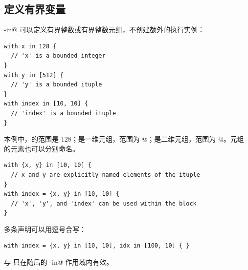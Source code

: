 \subsection*{定义有界变量}

\co@with-in@ 可以定义有界整数或有界整数元组，不创建额外的执行实例：

\begin{lstlisting}[language=croqtile,caption={一个有界变量}]
with x in 128 {
  // 'x' is a bounded integer
}
with y in [512] {
  // 'y' is a bounded ituple
}
with index in [10, 10] {
  // 'index' is a bounded ituple
}
\end{lstlisting}

本例中，\co@x@ 的范围是 128；\co@y@ 是一维元组，范围为 \co@[512]@；\co@index@ 是二维元组，范围为 \co@[10, 10]@。元组的元素也可以分别命名。

\begin{lstlisting}[language=croqtile,caption={一组有界变量}]
with {x, y} in [10, 10] {
  // x and y are explicitly named elements of the ituple
}
with index = {x, y} in [10, 10] {
  // 'x', 'y', and 'index' can be used within the block
}
\end{lstlisting}

多条声明可以用逗号合写：

\begin{lstlisting}[language=croqtile,caption={由元组导出的变量}]
with index = {x, y} in [10, 10], idx in [100, 10] { }
\end{lstlisting}

\co@index@ 与 \co@idx@ 只在随后的 \co@with-in@ 作用域内有效。
